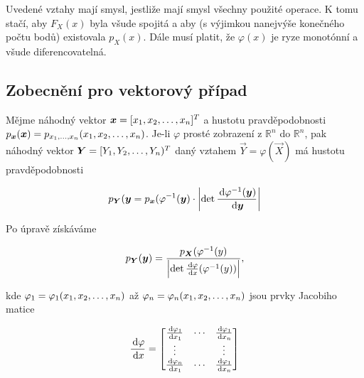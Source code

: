 Uvedené vztahy mají smysl, jestliže mají smysl všechny použité operace. K tomu stačí, aby $F_X(x)$ byla všude spojitá a aby (s výjimkou nanejvýše konečného počtu bodů) existovala $p_X(x)$. Dále musí platit, že $\varphi(x)$ je ryze monotónní a všude diferencovatelná.

\subsection{Zobecnění pro vektorový případ}
Mějme náhodný vektor $\vec{x}=[\vecrow[x]]^T$ a hustotu pravděpodobnosti\\ $p_{\vec{x}}(\vec{x})=p_{\svecrow[x]}(\vecrow[x])$. Je-li $\varphi$ prosté zobrazení z $\mathbb{R}^n$ do $\mathbb{R}^n$, pak náhodný vektor $\vec{Y}=[\vecrow[Y])^T$ daný vztahem $\vec{Y}=\varphi(\vec{X})$ má hustotu pravděpodobnosti

\[ p_{\vec{Y}}(\vec{y}=p_{\vec{x}}(\varphi^{-1}(\vec{y})\cdot\left|\det\frac{\d\varphi^{-1}(\vec{y})}{\d\vec{y}}\right| \]

Po úpravě získáváme

\[ p_{\vec{Y}}(\vec{y})=\frac{p_{\vec{X}}(\varphi^{-1}(y)}{\left|\det\frac{\d\varphi}{\d x}(\varphi^{-1}(y))\right|}, \]

kde $\varphi_1=\varphi_1(\vecrow[x])$ až $\varphi_n=\varphi_n(\vecrow[x])$ jsou prvky Jacobiho matice

\[ \frac{\d\varphi}{\d x}=\begin{bmatrix}
\frac{\d\varphi_1}{\d x_1} &  \cdots & \frac{\d\varphi_1}{\d x_n}\\
\vdots & & \vdots\\
\frac{\d\varphi_n}{\d x_1} & \cdots & \frac{\d\varphi_1}{\d x_n}
\end{bmatrix} \]